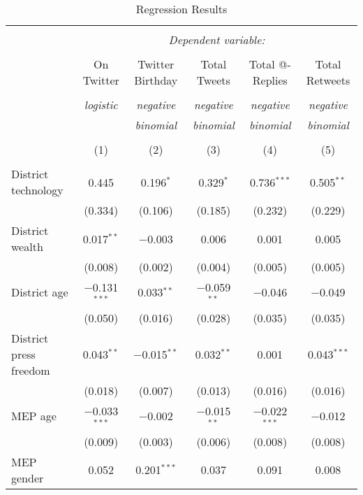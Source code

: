 \documentclass[12pt]{article}\usepackage[]{graphicx}\usepackage[]{color}
\begin{document}
\clearpage
\begin{landscape}

\begin{table}[!htbp] \centering 
  \caption{Regression Results} 
  \label{} 
\footnotesize 
\begin{tabular}{@{\extracolsep{5pt}}lccccc} 
\\[-1.8ex]\hline 
\hline \\[-1.8ex] 
 & \multicolumn{5}{c}{\textit{Dependent variable:}} \\ 
\cline{2-6} 
\\[-1.8ex] & On Twitter & Twitter Birthday & Total Tweets & Total @-Replies & Total Retweets \\ 
\\[-1.8ex] & \textit{logistic} & \textit{negative} & \textit{negative} & \textit{negative} & \textit{negative} \\ 
 & \textit{} & \textit{binomial} & \textit{binomial} & \textit{binomial} & \textit{binomial} \\ 
\\[-1.8ex] & (1) & (2) & (3) & (4) & (5)\\ 
\hline \\[-1.8ex] 
 District technology & 0.445 & 0.196$^{*}$ & 0.329$^{*}$ & 0.736$^{***}$ & 0.505$^{**}$ \\ 
  & (0.334) & (0.106) & (0.185) & (0.232) & (0.229) \\ 
  District wealth & 0.017$^{**}$ & $-$0.003 & 0.006 & 0.001 & 0.005 \\ 
  & (0.008) & (0.002) & (0.004) & (0.005) & (0.005) \\ 
  District age & $-$0.131$^{***}$ & 0.033$^{**}$ & $-$0.059$^{**}$ & $-$0.046 & $-$0.049 \\ 
  & (0.050) & (0.016) & (0.028) & (0.035) & (0.035) \\ 
  District press freedom & 0.043$^{**}$ & $-$0.015$^{**}$ & 0.032$^{**}$ & 0.001 & 0.043$^{***}$ \\ 
  & (0.018) & (0.007) & (0.013) & (0.016) & (0.016) \\ 
  MEP age & $-$0.033$^{***}$ & $-$0.002 & $-$0.015$^{**}$ & $-$0.022$^{***}$ & $-$0.012 \\ 
  & (0.009) & (0.003) & (0.006) & (0.008) & (0.008) \\ 
  MEP gender & 0.052 & 0.201$^{***}$ & 0.037 & 0.091 & 0.008 \\ 

\end{tabular}
\end{table}
\end{landscape}
\end{document}
